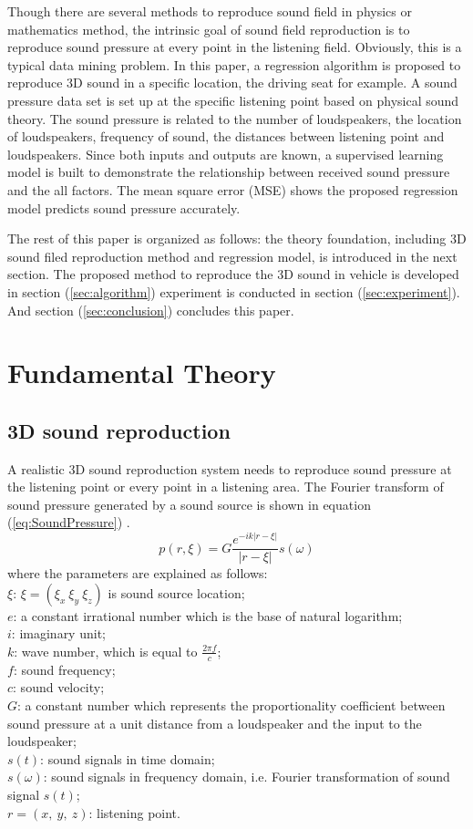 \documentclass[runningheads,a4paper]{llncs}
\begin{document}
Though there are several methods to reproduce sound field in physics or mathematics method, the intrinsic goal of sound field reproduction is to reproduce sound pressure at every point in the listening field. Obviously, this is a typical data mining problem. In this paper, a regression algorithm is proposed to reproduce 3D sound in a specific location, the driving seat for example. A sound pressure data set is set up at the specific listening point based on physical sound theory. The sound pressure is related to the number of loudspeakers, the location of loudspeakers, frequency of sound, the distances between listening point and loudspeakers. Since both inputs and outputs are known, a supervised learning model is built to demonstrate the relationship between received sound pressure and the all factors. The mean square error (MSE) shows the proposed regression model predicts sound pressure accurately.

The rest of this paper is organized as follows: the theory foundation, including 3D sound filed reproduction method and regression model, is introduced in the next section. The proposed method to reproduce the 3D sound in vehicle is developed in section (\ref{sec:algorithm}) experiment is conducted in section (\ref{sec:experiment}). And section (\ref{sec:conclusion}) concludes this paper.


\section{Fundamental Theory}\label{sec:Fundamental}
\subsection{3D sound reproduction}
A realistic 3D sound reproduction system needs to reproduce sound pressure at the listening point or every point in a listening area. The Fourier transform of sound pressure generated by a sound source is shown in equation (\ref{eq:SoundPressure}) \cite{zms2015}\cite{Ando11TASLP}\cite{WS13ICME}.
\begin{equation}\label{eq:SoundPressure}
p(r,\xi)=G\frac{e^{-ik|r-\xi|}}{|r-\xi|}s(\omega)
\end{equation}
where the parameters are explained as follows:\\
$\xi$: $\xi=(\xi_x\ \xi_y\ \xi_z)$ is sound source location;\\
$e$: a constant irrational number which is the base of natural logarithm;\\
$i$: imaginary unit;\\
$k$: wave number, which is equal to $\frac{2{\pi}f}{c}$;\\
$f$: sound frequency; \\
$c$: sound velocity;\\
$G$: a constant number which represents the proportionality coefficient between sound pressure at a unit distance from a loudspeaker and the input to the loudspeaker;\\
$s(t)$: sound signals in time domain; \\
$s(\omega)$: sound signals in frequency domain, i.e. Fourier transformation of sound signal $s(t)$;\\
$r=(x,\ y,\ z)$: listening point.
\end{document}
